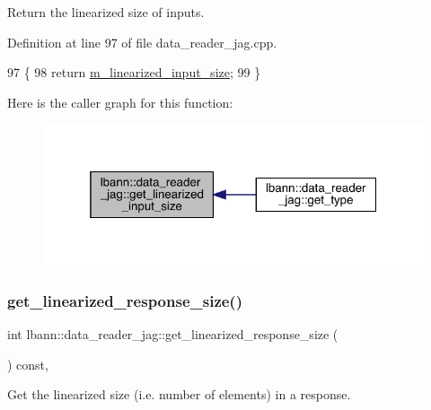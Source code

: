 Return the linearized size of inputs. 



Definition at line 97 of file data\+\_\+reader\+\_\+jag.\+cpp.


\begin{DoxyCode}
97                                                         \{
98   \textcolor{keywordflow}{return} \hyperlink{classlbann_1_1data__reader__jag_a75e3c8870f9fc8e50fb24e4515ac7d82}{m\_linearized\_input\_size};
99 \}
\end{DoxyCode}
Here is the caller graph for this function\+:\nopagebreak
\begin{figure}[H]
\begin{center}
\leavevmode
\includegraphics[width=319pt]{classlbann_1_1data__reader__jag_a2396088a5c5aac058f89702eea23b86f_icgraph}
\end{center}
\end{figure}
\mbox{\label{classlbann_1_1data__reader__jag_ad8e4752ead359374c9c7c10becf6aec1}} 
\subsubsection{\texorpdfstring{get\+\_\+linearized\+\_\+response\+\_\+size()}{get\_linearized\_response\_size()}}
{\footnotesize\ttfamily int lbann\+::data\+\_\+reader\+\_\+jag\+::get\+\_\+linearized\+\_\+response\+\_\+size (\begin{DoxyParamCaption}{ }\end{DoxyParamCaption}) const\hspace{0.3cm}{\ttfamily [override]}, {\ttfamily [virtual]}}



Get the linearized size (i.\+e. number of elements) in a response. 



